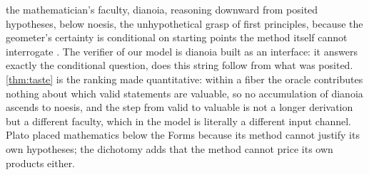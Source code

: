 \documentclass[11pt]{article}
\numberwithin{equation}{section}
\theoremstyle{plain}
\theoremstyle{definition}
\theoremstyle{remark}
\begin{document}
the mathematician's faculty, dianoia, reasoning downward from posited hypotheses, below
noesis, the unhypothetical grasp of first principles, because the geometer's certainty is
conditional on starting points the method itself cannot interrogate \citep{plato_republic}.
The verifier of our model is dianoia built as an interface: it answers exactly the
conditional question, does this string follow from what was posited. \cref{thm:taste} is
the ranking made quantitative: within a fiber the oracle contributes nothing about which
valid statements are valuable, so no accumulation of dianoia ascends to noesis, and the
step from valid to valuable is not a longer derivation but a different faculty, which in
the model is literally a different input channel. Plato placed mathematics below the Forms
because its method cannot justify its own hypotheses; the dichotomy adds that the method
cannot price its own products either.
\end{document}
